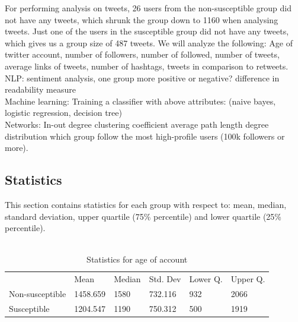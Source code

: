 \documentclass[10pt]{IEEEtran}
\begin{document}
For performing analysis on tweets, 26 users from the non-susceptible group did not have any tweets, which shrunk the group down to 1160 when analysing tweets. Just one of the users in the susceptible group did not have any tweets, which gives us a group size of 487 tweets.
We will analyze the following: Age of twitter account, number of followers, number of followed, number of tweets, average links of tweets, number of hashtags, tweets in comparison to retweets.
\\
NLP:
sentiment analysis, one group more positive or negative?
difference in readability measure
\\
Machine learning:
Training a classifier with above attributes: (naive bayes, logistic regression, decision tree)
\\
Networks:
In-out degree
clustering coefficient
average path length
degree distribution
which group follow the most high-profile users (100k followers or more).

\subsection{Statistics}
This section contains statistics for each group with respect to: mean, median, standard deviation, upper quartile (75\% percentile) and lower quartile (25\% percentile).\\\\

\begin{table}[ht!]
\begin{tabular}{llllll}
\textbf{}       & Mean     & Median & Std. Dev & Lower Q. & Upper Q. \\
Non-susceptible & 1458.659 & 1580   & 732.116  & 932     & 2066      \\
Susceptible     & 1204.547 & 1190   & 750.312  &  500    &   1919   
\end{tabular}
\caption{Statistics for age of account}
\end{table}
\end{document}
